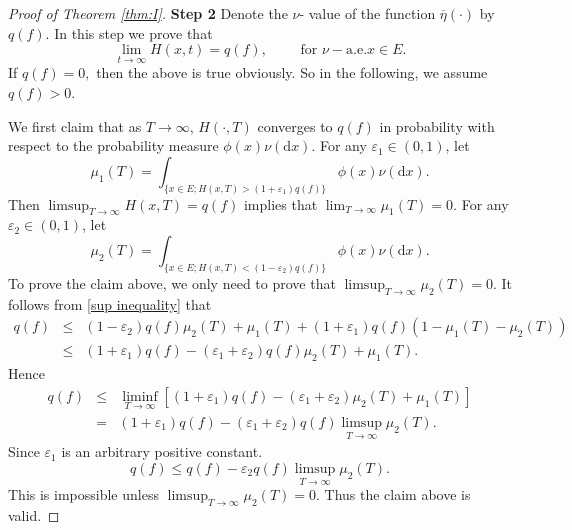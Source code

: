 \documentclass[12pt,a4paper]{amsart}
\numberwithin{equation}{section}
\theoremstyle{plain}
\theoremstyle{definition}
\theoremstyle{remark}
\begin{document}
\begin{proof}[Proof of Theorem \ref{thm:I}]
{\bf Step 2}\quad
 Denote the $\nu$- value of the function $\overline\eta(\cdot)$ by $q(f)$.  In this step we prove that
 \begin{equation}\label{limit-H}
 \lim_{t\rightarrow\infty}H(x,t)=q(f),\qquad 
 \text{ for } \nu-\text{a.e.}x\in E.
 \end{equation}
If $q(f)= 0,$ then the above is true obviously. So in the
following, we assume $q(f)>0$.

We first claim that  as $T\to\infty$, $H(\cdot,T)$ converges to $q(f)$ in probability  
with respect to the probability measure $\phi(x)\nu(\mathrm dx)$. 
For  any $\varepsilon_1\in (0, 1)$, let
$$
\mu_1(T)=\int_{\{x\in E;H(x,T)>(1+\varepsilon_1)q(f)\}}
\phi(x)\nu(\mathrm dx).
$$
Then $\limsup_{T\to\infty}H(x,T)=q(f)$ implies that $\lim_{T\rightarrow\infty}\mu_1(T)=0.$  %
For any $\varepsilon_2\in (0, 1)$, let
$$
\mu_2(T)=\int_{\{x\in E;H(x,T)<(1-\varepsilon_2)q(f)\}}
\phi(x)\nu(\mathrm dx).
$$
To prove the claim above, we only need to prove that  $\limsup_{T\rightarrow\infty}\mu_2(T)=0.$
It follows  from \eqref{sup inequality} that
\begin{eqnarray}\label{sublimitinprob}
q(f)&\leq&
(1-\varepsilon_2)q(f)\mu_2(T)+\mu_1(T)+(1+\varepsilon_1)q(f)(1-\mu_1(T)-\mu_2(T))\\
&\le
&(1+\varepsilon_1)q(f)-(\varepsilon_1+\varepsilon_2)q(f)\mu_2(T)+\mu_1(T).
\end{eqnarray}
 Hence
\begin{eqnarray*}\label{sublimitinequl}
q(f)&\leq&
\liminf_{T\rightarrow\infty}\left[(1+\varepsilon_1)q(f)-(\varepsilon_1+\varepsilon_2)\mu_2(T)%
+\mu_1(T)\right]\\
&=&(1+\varepsilon_1)q(f)-(\varepsilon_1+\varepsilon_2)q(f)\limsup_{T\rightarrow\infty}\mu_2(T).
\end{eqnarray*}
Since $\varepsilon_1$ is an arbitrary positive constant.
\[
q(f)\leq q(f)-\varepsilon_2 q(f)\limsup_{T\rightarrow\infty}\mu_2(T).
\]
This is impossible unless $\limsup_{T\rightarrow\infty}\mu_2(T)=0.$
Thus the claim above is valid.



\end{proof}
\end{document}

